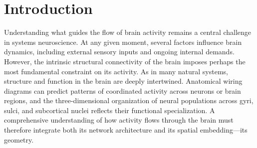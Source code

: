 \documentclass{article}
\begin{document}
\hrulefill
\vspace{10 pt}


\section*{Introduction}

Understanding what guides the flow of brain activity remains a central challenge in systems neuroscience. At any given moment, several factors influence brain dynamics, including external sensory inputs and ongoing internal demands\cite{flavell2022emergence}. However, the intrinsic structural connectivity of the brain imposes perhaps the most fundamental constraint on its activity\cite{suarez2020linking}. As in many natural systems, structure and function in the brain are deeply intertwined. Anatomical wiring diagrams can predict patterns of coordinated activity across neurons\cite{uzel2022set, randi2023neural, lappalainen2024connectome} or brain regions\cite{legare2025structural}, and the three-dimensional organization of neural populations across gyri, sulci, and subcortical nuclei reflects their functional specialization\cite{petersen2024principles}. A comprehensive understanding of how activity flows through the brain must therefore integrate both its network architecture and its spatial embedding---its geometry.
\end{document}
